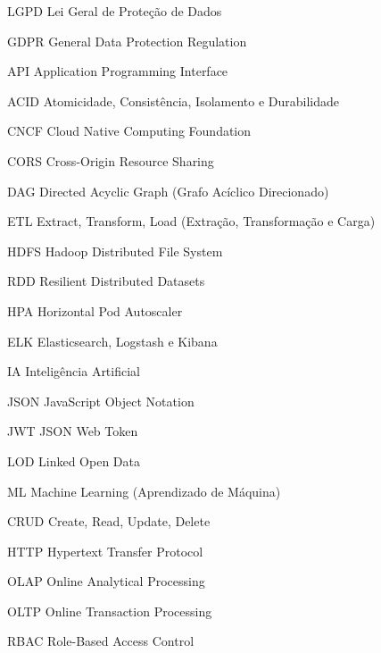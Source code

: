 \begin{siglas}
  \item[LGPD] Lei Geral de Proteção de Dados
  \item[GDPR] General Data Protection Regulation
  \item[API] Application Programming Interface
  \item[ACID] Atomicidade, Consistência, Isolamento e Durabilidade
  \item[CNCF] Cloud Native Computing Foundation
  \item[CORS] Cross-Origin Resource Sharing
  \item[DAG] Directed Acyclic Graph (Grafo Acíclico Direcionado)
  \item[ETL] Extract, Transform, Load (Extração, Transformação e Carga)
  \item[HDFS] Hadoop Distributed File System
  \item[RDD] Resilient Distributed Datasets
  \item[HPA] Horizontal Pod Autoscaler
  \item[ELK] Elasticsearch, Logstash e Kibana
  \item[IA] Inteligência Artificial
  \item[JSON] JavaScript Object Notation
  \item[JWT] JSON Web Token
  \item[LOD] Linked Open Data
  \item[ML] Machine Learning (Aprendizado de Máquina)
  \item[CRUD] Create, Read, Update, Delete
  \item[HTTP] Hypertext Transfer Protocol
  \item[OLAP] Online Analytical Processing
  \item[OLTP] Online Transaction Processing
  \item[RBAC] Role-Based Access Control

\end{siglas}
